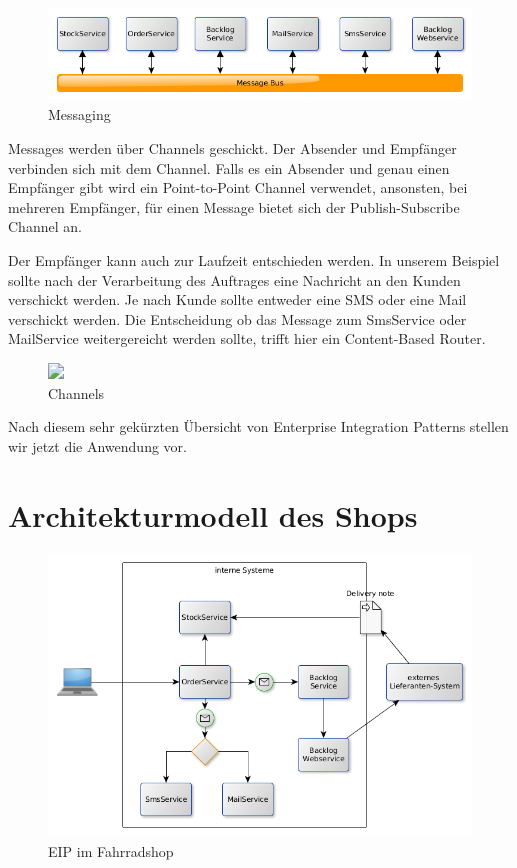 \documentclass[12pt,a4paper,ngerman]{article}
\makeatletter
\def\maxwidth{\ifdim\Gin@nat@width>\linewidth\linewidth
\else\Gin@nat@width\fi}
\let\Oldincludegraphics\includegraphics
\renewcommand{\includegraphics}[1]{\Oldincludegraphics[width=\maxwidth]{#1}}
\makeatother
\begin{document}
\begin{figure}[htbp]
\centering
\includegraphics{messaging.png}
\caption{Messaging}
\end{figure}

Messages werden über Channels geschickt. Der Absender und Empfänger
verbinden sich mit dem Channel. Falls es ein Absender und genau einen
Empfänger gibt wird ein Point-to-Point Channel verwendet, ansonsten, bei
mehreren Empfänger, für einen Message bietet sich der Publish-Subscribe
Channel an.

Der Empfänger kann auch zur Laufzeit entschieden werden. In unserem
Beispiel sollte nach der Verarbeitung des Auftrages eine Nachricht an
den Kunden verschickt werden. Je nach Kunde sollte entweder eine SMS
oder eine Mail verschickt werden. Die Entscheidung ob das Message zum
SmsService oder MailService weitergereicht werden sollte, trifft hier
ein Content-Based Router.


\begin{figure}[htbp]
\begin{center}
\Oldincludegraphics[height=10cm]{channels.png}
\end{center}
\caption{Channels}
\end{figure}

Nach diesem sehr gekürzten Übersicht von Enterprise Integration Patterns
stellen wir jetzt die Anwendung vor.

\section{Architekturmodell des Shops}

\begin{figure}[htbp]
\centering
\includegraphics{eip.png}
\caption{EIP im Fahrradshop}
\end{figure}
\end{document}
